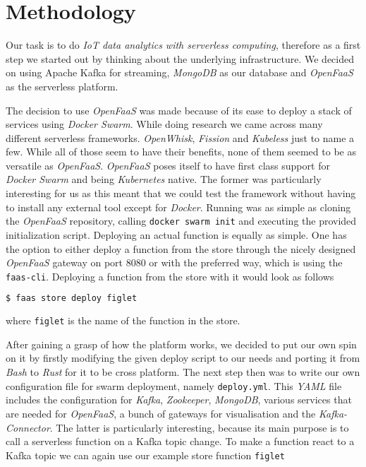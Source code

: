 \section{Methodology}


Our task is to do \textit{IoT data analytics with serverless computing}, therefore as a first step
we started out by thinking about the underlying infrastructure. We decided on using Apache Kafka for
streaming, \textit{MongoDB} as our database and \textit{OpenFaaS} as the serverless platform.

The decision to use \textit{OpenFaaS} was made because of its ease to deploy a stack of services
using \textit{Docker Swarm}. While doing research we came across many different serverless
frameworks. \textit{OpenWhisk}, \textit{Fission} and \textit{Kubeless} just to name a few. While all
of those seem to have their benefits, none of them seemed to be as versatile as \textit{OpenFaaS}.
\textit{OpenFaaS} poses itself to have first class support for \textit{Docker Swarm} and being
\textit{Kubernetes} native. The former was particularly interesting for us as this meant that we
could test the framework without having to install any external tool except for  \textit{Docker}.
Running was as simple as cloning the \textit{OpenFaaS} repository, calling \texttt{docker swarm
init} and executing the provided initialization script. Deploying an actual function is equally as
simple. One has the option to either deploy a function from the store through the nicely designed
\textit{OpenFaaS} gateway on port 8080 or with the preferred way, which is using the
\texttt{faas-cli}. Deploying a function from the store with it would look as follows

\begin{lstlisting}[language=bash]
$ faas store deploy figlet
\end{lstlisting}

where \texttt{figlet} is the name of the function in the store.

After gaining a grasp of how the platform works, we decided to put our own spin on it by firstly
modifying the given deploy script to our needs and porting it from \textit{Bash} to \textit{Rust}
for it to be cross platform. The next step then was to write our own configuration file for swarm
deployment, namely \texttt{deploy.yml}. This \textit{YAML} file includes the configuration for
\textit{Kafka}, \textit{Zookeeper}, \textit{MongoDB}, various services that are needed for
\textit{OpenFaaS}, a bunch of gateways for visualisation and the \textit{Kafka-Connector}. The
latter is particularly interesting, because its main purpose is to call a serverless function on a
Kafka topic change. To make a function react to a Kafka topic we can again use our example store
function \texttt{figlet}


